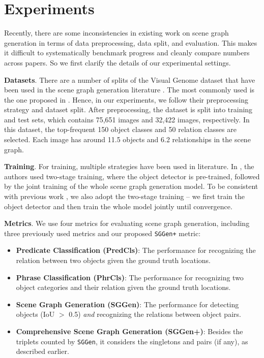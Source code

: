 \section{Experiments}
Recently, there are some inconsistencies in existing work on scene graph generation in terms of data preprocessing, data split, and evaluation. This makes it difficult to systematically benchmark progress and cleanly compare numbers across papers. So we first clarify the details of our experimental settings.

\textbf{Datasets}. There are a number of splits of the Visual Genome dataset that have been used in the scene graph generation literature \cite{xu2017scene,li2017scene,zhang2017relationship}. The most commonly used is the one proposed in \cite{xu2017scene}. Hence, in our experiments, we follow their preprocessing strategy and dataset split. After preprocessing, the dataset is split into training and test sets, which contains 75,651 images and 32,422 images, respectively. In this dataset, the top-frequent 150 object classes and 50 relation classes are selected. Each image has around 11.5 objects and 6.2 relationships in the scene graph.

\textbf{Training}. For training, multiple strategies have been used in literature. In \cite{xu2017scene,li2017scene,newell2017pixels}, the authors used two-stage training, where the object detector is pre-trained, followed by the joint training of the whole scene graph generation model. To be consistent with previous work \cite{xu2017scene,li2017scene}, 
we also adopt the two-stage training -- 
we first train the object detector and then train the whole model jointly until convergence. 

\textbf{Metrics}. We use four metrics for evaluating scene graph generation, including three previously used metrics and our proposed \texttt{SGGen+} metric:
\begin{itemize}[noitemsep]
\setlength\itemsep{0em}
\item \textbf{Predicate Classification (PredCls)}: The performance for recognizing the relation between two objects given the ground truth locations.
\item \textbf{Phrase Classification (PhrCls)}: The performance for recognizing two object categories and their relation given the ground truth locations.
\item \textbf{Scene Graph Generation (SGGen)}: The performance for detecting objects (IoU $>$ 0.5) \emph{and} recognizing the relations between object pairs.
\item \textbf{Comprehensive Scene Graph Generation (SGGen+)}: Besides the triplets counted by \texttt{SGGen}, it considers the singletons and pairs (if any), as described earlier.
\end{itemize}

